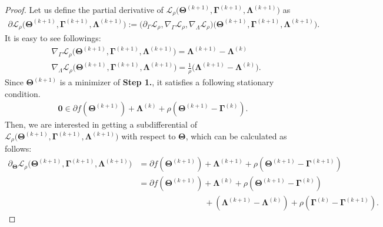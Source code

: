 \documentclass[alpha-refs]{wiley-article}
\begin{document}
\begin{proof}
Let us define the partial derivative of $\mathcal{L}_{\rho} \big( \boldsymbol{\Theta}^{(k+1)},\boldsymbol{\Gamma}^{(k+1)},\boldsymbol{\Lambda}^{(k+1)} \big)$ as
\begin{align*}
    \partial \mathcal{L}_{\rho} \big( \boldsymbol{\Theta}^{(k+1)},\boldsymbol{\Gamma}^{(k+1)},\boldsymbol{\Lambda}^{(k+1)} \big)
    := \big( \partial_{\Gamma} \mathcal{L}_{\rho}, \nabla_{\Gamma} \mathcal{L}_{\rho}, \nabla_{\Lambda} \mathcal{L}_{\rho} \big)\big(\boldsymbol{\Theta}^{(k+1)},\boldsymbol{\Gamma}^{(k+1)},\boldsymbol{\Lambda}^{(k+1)} \big).
\end{align*}
It is easy to see followings:
\begin{align*}
    &\nabla_{\Gamma} \mathcal{L}_{\rho} \big( \boldsymbol{\Theta}^{(k+1)},\boldsymbol{\Gamma}^{(k+1)},\boldsymbol{\Lambda}^{(k+1)} \big)
    = \boldsymbol{\Lambda}^{(k+1)} - \boldsymbol{\Lambda}^{(k)} \\
    &\nabla_{\Lambda} \mathcal{L}_{\rho} \big( \boldsymbol{\Theta}^{(k+1)},\boldsymbol{\Gamma}^{(k+1)},\boldsymbol{\Lambda}^{(k+1)} \big)
    = \frac{1}{\rho} \big( \boldsymbol{\Lambda}^{(k+1)} - \boldsymbol{\Lambda}^{(k)} \big).
\end{align*}
Since $\boldsymbol{\Theta}^{(k+1)}$ is a minimizer of \textbf{Step 1.}, it satisfies a following stationary condition.
\begin{align} \label{subgradient}
    \boldsymbol{0} \in \partial f(\boldsymbol{\Theta}^{(k+1)}) + \boldsymbol{\Lambda}^{(k)} + \rho (\boldsymbol{\Theta}^{(k+1)} - \boldsymbol{\Gamma}^{(k)}).
\end{align}
Then, we are interested in getting a subdifferential of $\mathcal{L}_{\rho} \big( \boldsymbol{\Theta}^{(k+1)},\boldsymbol{\Gamma}^{(k+1)},\boldsymbol{\Lambda}^{(k+1)} \big)$ with respect to $\boldsymbol{\Theta}$, which can be calculated as follows:
\begin{align*}
    \partial_{\boldsymbol{\Theta}}\mathcal{L}_{\rho} \big( \boldsymbol{\Theta}^{(k+1)},\boldsymbol{\Gamma}^{(k+1)},\boldsymbol{\Lambda}^{(k+1)} \big)
    &= \partial f(\boldsymbol{\Theta}^{(k+1)}) + \boldsymbol{\Lambda}^{(k+1)} + \rho (\boldsymbol{\Theta}^{(k+1)} - \boldsymbol{\Gamma}^{(k+1)}) \\
    &= \partial f(\boldsymbol{\Theta}^{(k+1)}) + \boldsymbol{\Lambda}^{(k)} + \rho (\boldsymbol{\Theta}^{(k+1)} - \boldsymbol{\Gamma}^{(k)}) \\
    &\qquad \qquad \qquad \qquad + (\boldsymbol{\Lambda}^{(k+1)} - \boldsymbol{\Lambda}^{(k)}) + \rho (\boldsymbol{\Gamma}^{(k)} - \boldsymbol{\Gamma}^{(k+1)} ).

\end{align*}
\end{proof}
\end{document}
